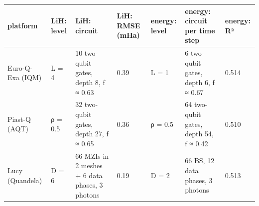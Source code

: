 \begin{tabular}{lllllll}
\toprule
platform & LiH: level & LiH: circuit & LiH: RMSE (mHa) & energy: level & energy: circuit per time step & energy: R² \\
\midrule
Euro-Q-Exa (IQM) & L = 4 & 10 two-qubit gates, depth 8, f ≈ 0.63 & 0.39 & L = 1 & 6 two-qubit gates, depth 6, f ≈ 0.67 & 0.514 \\
Piast-Q (AQT) & ρ = 0.5 & 32 two-qubit gates, depth 27, f ≈ 0.65 & 0.36 & ρ = 0.5 & 64 two-qubit gates, depth 54, f ≈ 0.42 & 0.510 \\
Lucy (Quandela) & D = 6 & 66 MZIs in 2 meshes + 6 data phases, 3 photons & 0.19 & D = 2 & 66 BS, 12 data phases, 3 photons & 0.513 \\
\bottomrule
\end{tabular}
